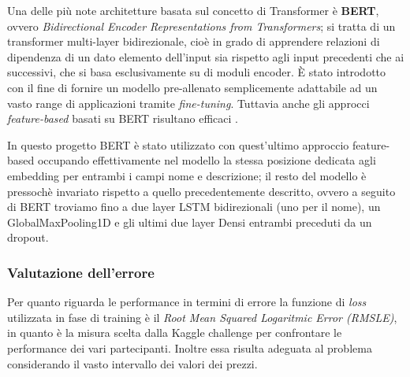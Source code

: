 
Una delle più note architetture basata sul concetto di Transformer è
\textbf{BERT}, ovvero \textit{Bidirectional Encoder Representations from
Transformers}; si tratta di un transformer multi-layer bidirezionale, cioè in
grado di apprendere relazioni di dipendenza di un dato elemento dell'input sia
rispetto agli input precedenti che ai successivi, che si basa esclusivamente su
di moduli encoder. È stato introdotto con il fine di fornire un modello
pre-allenato semplicemente adattabile ad un vasto range di applicazioni tramite
\textit{fine-tuning}. Tuttavia anche gli approcci \textit{feature-based} basati
su BERT risultano efficaci \cite{devlin2018bert}.

In questo progetto BERT è stato utilizzato con quest'ultimo approccio
feature-based occupando effettivamente nel modello la stessa posizione dedicata
agli embedding per entrambi i campi nome e descrizione; il resto del modello è
pressochè invariato rispetto a quello precedentemente descritto, ovvero a
seguito di BERT troviamo fino a due layer LSTM bidirezionali (uno per il nome),
un GlobalMaxPooling1D e gli ultimi due layer Densi entrambi preceduti da un
dropout.

\subsubsection{Valutazione dell'errore}

Per quanto riguarda le performance in termini di errore la funzione di
\textit{loss} utilizzata in fase di training è il \textit{Root Mean Squared
Logaritmic Error (RMSLE)}, in quanto è la misura scelta dalla Kaggle challenge
per confrontare le performance dei vari partecipanti. Inoltre essa risulta
adeguata al problema considerando il vasto intervallo dei valori dei prezzi.

